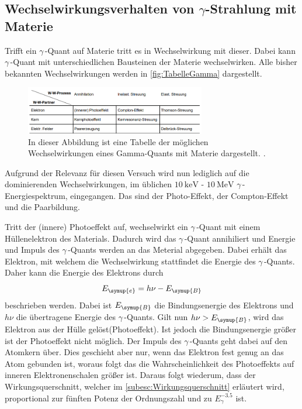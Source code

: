 \subsection{\texorpdfstring{Wechselwirkungsverhalten von $\gamma$-Strahlung mit Materie}{Wechselwirkungsverhalten von Gamma-Strahlung mit Materie}}
\label{Gammawechselwirkung}
Trifft ein $\gamma$\,-Quant auf Materie tritt es in Wechselwirkung mit dieser. Dabei kann $\gamma$\,-Quant mit unterschiedlichen Bausteinen der Materie wechselwirken. 
Alle bisher bekannten Wechselwirkungen werden in \autoref{fig:TabelleGamma} dargestellt.

\begin{figure}
    \centering
    \includegraphics[width = 0.7\textwidth]{content/TabelleGamma.png}
    \caption{In dieser Abbildung ist eine Tabelle der möglichen Wechselwirkungen eines Gamma-Quants mit Materie dargestellt. \cite{v704}.}
    \label{fig:TabelleGamma}
\end{figure}

Aufgrund der Relevanz für diesen Versuch wird nun lediglich auf die dominierenden Wechselwirkungen, im üblichen $\qty{10}{\kilo\electronvolt}$ - $\qty{10}{\mega\electronvolt}$
$\gamma$\,-Energiespektrum, eingegangen. Das sind der Photo-Effekt, der Compton-Effekt und die Paarbildung.


Tritt der (innere) Photoeffekt auf, wechselwirkt ein $\gamma$\,-Quant mit einem Hüllenelektron des Materials. Dadurch wird das $\gamma$\,-Quant annihiliert und Energie und 
Impuls des $\gamma$\,-Quants werden an das Meterial abgegeben. Dabei erhält das Elektron, mit welchem die Wechselwirkung stattfindet die Energie des $\gamma$\,-Quants.
Daher kann die Energie des Elektrons durch 
\begin{equation*}
    E_{\symup{e}} = h\nu - E_{\symup{B}}
\end{equation*}
beschrieben werden. Dabei ist $E_{\symup{B}}$ die Bindungsenergie des Elektrons und $h\nu$ die übertragene Energie des $\gamma$\,-Quants. Gilt nun $h\nu > E_{\symup{B}}$, wird
das Elektron aus der Hülle gelöst(Photoeffekt). Ist jedoch die Bindungsenergie größer ist der Photoeffekt nicht möglich.  Der Impuls des $\gamma$\,-Quants geht dabei auf den 
Atomkern über. Dies geschieht aber nur, wenn das Elektron fest genug an das Atom gebunden ist, woraus folgt das die Wahrscheinlichkeit des Photoeffekts auf inneren 
Elektronenschalen größer ist. Daraus folgt wiederum, dass der Wirkungsquerschnitt, welcher im \autoref{subesc:Wirkungsquerschnitt} erläutert wird, proportional zur fünften 
Potenz der Ordnungszahl und zu $E_\gamma^{-3.5}$ ist.


